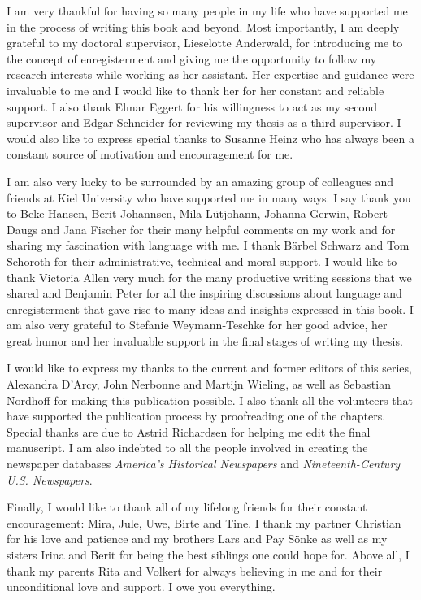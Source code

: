 \addchap{\lsAcknowledgementTitle} 
I am very thankful for having so many people in my life who have supported me in the process of writing this book and beyond. Most importantly, I am deeply grateful to my doctoral supervisor, Lieselotte Anderwald, for introducing me to the concept of enregisterment and giving me the opportunity to follow my research interests while working as her assistant. Her expertise and guidance were invaluable to me and I would like to thank her for her constant and reliable support. I also thank Elmar Eggert for his willingness to act as my second supervisor and Edgar Schneider for reviewing my thesis as a third supervisor. I would also like to express special thanks to Susanne Heinz who has always been a constant source of motivation and encouragement for me.

I am also very lucky to be surrounded by an amazing group of colleagues and friends at Kiel University who have supported me in many ways. I say thank you to Beke Hansen, Berit Johannsen, Mila Lütjohann, Johanna Gerwin, Robert Daugs and Jana Fischer for their many helpful comments on my work and for sharing my fascination with language with me. I thank Bärbel Schwarz and Tom Schoroth for their administrative, technical and moral support. I would like to thank Victoria Allen very much for the many productive writing sessions that we shared and Benjamin Peter for all the inspiring discussions about language and enregisterment that gave rise to many ideas and insights expressed in this book. I am also very grateful to Stefanie Weymann-Teschke for her good advice, her great humor and her invaluable support in the final stages of writing my thesis.

I would like to express my thanks to the current and former editors of this series, Alexandra D’Arcy, John Nerbonne and Martijn Wieling, as well as Sebastian Nordhoff for making this publication possible. I also thank all the volunteers that have supported the publication process by proofreading one of the chapters. Special thanks are due to Astrid Richardsen for helping me edit the final manuscript. I am also indebted to all the people involved in creating the newspaper databases \textit{America’s Historical Newspapers} and \textit{Nineteenth-Century U.S. Newspapers}.

Finally, I would like to thank all of my lifelong friends for their constant encouragement: Mira, Jule, Uwe, Birte and Tine. I thank my partner Christian for his love and patience and my brothers Lars and Pay Sönke as well as my sisters Irina and Berit for being the best siblings one could hope for. Above all, I thank my parents Rita and Volkert for always believing in me and for their unconditional love and support. I owe you everything.


